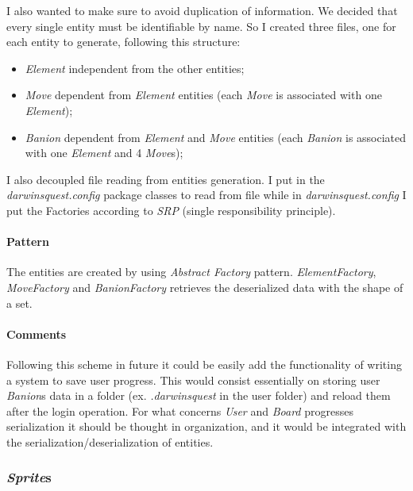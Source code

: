 \documentclass[12pt, a4paper]{report}
\theoremstyle{definition}
\begin{document}
            I also wanted to make sure to avoid duplication of information.
            We decided that every single entity must be identifiable by name.
            So I created three files, one for each entity to generate, following this structure:
            \begin{itemize}
                \item \emph{Element} \textrightarrow independent from the other entities;
                \item \emph{Move} \textrightarrow dependent from \emph{Element} entities (each \emph{Move} is associated with one \emph{Element});
                \item \emph{Banion} \textrightarrow dependent from \emph{Element} and \emph{Move} entities (each \emph{Banion} is associated with one \emph{Element} and 4 \emph{Move}s);
            \end{itemize}

            I also decoupled file reading from entities generation.
            I put in the \textit{darwinsquest.config} package classes to read from file while in \textit{darwinsquest.config} I put the Factories according to \emph{SRP} (single responsibility principle).

            \paragraph{Pattern}

            The entities are created by using \emph{Abstract Factory} pattern.
            \emph{ElementFactory}, \emph{MoveFactory} and \emph{BanionFactory} retrieves the deserialized data with the shape of a set.

            \paragraph{Comments}

            Following this scheme in future it could be easily add the functionality of writing a system to save user progress.
            This would consist essentially on storing user \emph{Banion}s data in a folder (ex. \emph{.darwinsquest} in the user folder) and reload them after the login operation.
            For what concerns \emph{User} and \emph{Board} progresses serialization it should be thought in organization, and it would be integrated with the serialization/deserialization of entities.

        \subsubsection{\emph{Sprite}s}
\end{document}
